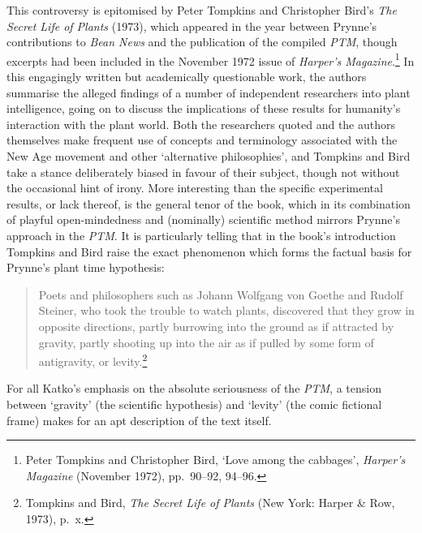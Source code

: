 \documentclass[]{article}
\begin{document}
This controversy is epitomised by Peter Tompkins and Christopher Bird’s
\emph{The Secret Life of Plants} (1973), which appeared in the year
between Prynne’s contributions to \emph{Bean News} and the publication
of the compiled \emph{PTM}, though excerpts had been included in the
November 1972 issue of \emph{Harper’s Magazine}.\footnote{Peter Tompkins
  and Christopher Bird, ‘Love among the cabbages’, \emph{Harper’s
  Magazine} (November 1972), pp.~90–92, 94–96.} In this engagingly
written but academically questionable work, the authors summarise the
alleged findings of a number of independent researchers into plant
intelligence, going on to discuss the implications of these results for
humanity’s interaction with the plant world. Both the researchers quoted
and the authors themselves make frequent use of concepts and terminology
associated with the New Age movement and other ‘alternative
philosophies’, and Tompkins and Bird take a stance deliberately biased
in favour of their subject, though not without the occasional hint of
irony. More interesting than the specific experimental results, or lack
thereof, is the general tenor of the book, which in its combination of
playful open-mindedness and (nominally) scientific method mirrors
Prynne’s approach in the \emph{PTM}. It is particularly telling that in
the book’s introduction Tompkins and Bird raise the exact phenomenon
which forms the factual basis for Prynne’s plant time hypothesis:

\begin{quote}
\singlespacing Poets and philosophers such as Johann Wolfgang von Goethe
and Rudolf Steiner, who took the trouble to watch plants, discovered
that they grow in opposite directions, partly burrowing into the ground
as if attracted by gravity, partly shooting up into the air as if pulled
by some form of antigravity, or levity.\footnote{Tompkins and Bird,
  \emph{The Secret Life of Plants} (New York: Harper \& Row, 1973),
  p.~x.}
\end{quote}

\noindent For all Katko’s emphasis on the absolute seriousness of the
\emph{PTM}, a tension between ‘gravity’ (the scientific hypothesis) and
‘levity’ (the comic fictional frame) makes for an apt description of the
text itself.
\end{document}
